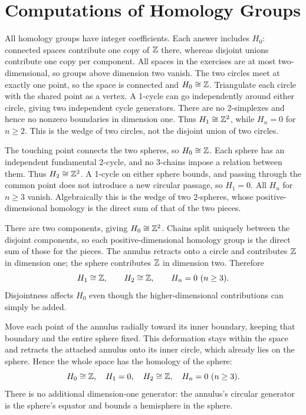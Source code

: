 \section{Computations of Homology Groups}
All homology groups have integer coefficients. Each answer includes $H_0$: connected spaces contribute one copy of $\mathbb{Z}$ there, whereas disjoint unions contribute one copy per component. All spaces in the exercises are at most two-dimensional, so groups above dimension two vanish.
The two circles meet at exactly one point, so the space is connected and $H_0\cong\mathbb{Z}$. Triangulate each circle with the shared point as a vertex. A 1-cycle can go independently around either circle, giving two independent cycle generators. There are no 2-simplexes and hence no nonzero boundaries in dimension one.
Thus $H_1\cong\mathbb{Z}^2$, while $H_n=0$ for $n\ge2$. This is the wedge of two circles, not the disjoint union of two circles.

The touching point connects the two spheres, so $H_0\cong\mathbb{Z}$. Each sphere has an independent fundamental 2-cycle, and no 3-chains impose a relation between them. Thus $H_2\cong\mathbb{Z}^2$.
A 1-cycle on either sphere bounds, and passing through the common point does not introduce a new circular passage, so $H_1=0$. All $H_n$ for $n\ge3$ vanish. Algebraically this is the wedge of two 2-spheres, whose positive-dimensional homology is the direct sum of that of the two pieces.

There are two components, giving $H_0\cong\mathbb{Z}^2$. Chains split uniquely between the disjoint components, so each positive-dimensional homology group is the direct sum of those for the pieces.
The annulus retracts onto a circle and contributes $\mathbb{Z}$ in dimension one; the sphere contributes $\mathbb{Z}$ in dimension two. Therefore
\[
H_1\cong\Z,\qquad H_2\cong\Z,\qquad H_n=0\ (n\ge3).
\]
Disjointness affects $H_0$ even though the higher-dimensional contributions can simply be added.

Move each point of the annulus radially toward its inner boundary, keeping that boundary and the entire sphere fixed. This deformation stays within the space and retracts the attached annulus onto its inner circle, which already lies on the sphere.
Hence the whole space has the homology of the sphere:
\[
H_0\cong\mathbb{Z},\quad H_1=0,\quad H_2\cong\mathbb{Z},
\quad H_n=0\ (n\ge3).
\]
There is no additional dimension-one generator: the annulus's circular generator is the sphere's equator and bounds a hemisphere in the sphere.

